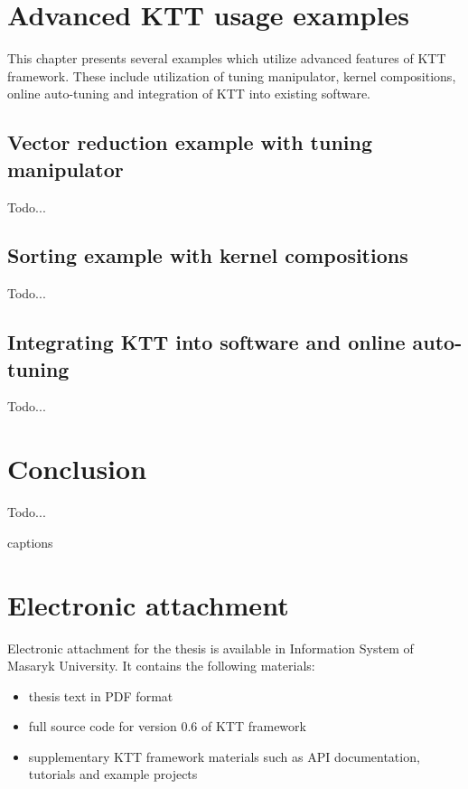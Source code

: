 \documentclass
[
    digital, %
    oneside, %
    table, %
    nolof, %
    nolot, %
    nocover %
]{fithesis3}
\begin{document}
\chapter{Advanced KTT usage examples}
\label{ktt-advanced-usage}
This chapter presents several examples which utilize advanced features of KTT framework. These include utilization of tuning manipulator, kernel
compositions, online auto-tuning and integration of KTT into existing software.

\section{Vector reduction example with tuning manipulator}
Todo...

\section{Sorting example with kernel compositions}
Todo...

\section{Integrating KTT into software and online auto-tuning}
Todo...

\chapter{Conclusion}
Todo...

\csname captions\languagename\endcsname
\makeatletter
\thesis@selectLocale{\thesis@locale}\makeatother
\printbibliography[heading=bibintoc]

\appendix
\chapter{Electronic attachment}
Electronic attachment for the thesis is available in Information System of Masaryk University. It contains the following materials:
\begin{itemize}
    \item thesis text in PDF format
    \item full source code for version 0.6 of KTT framework
    \item supplementary KTT framework materials such as API documentation, tutorials and example projects
\end{itemize}
\end{document}
